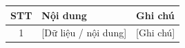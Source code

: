 \begin{tabular}{|c|l|l|}
  \hline
  \textbf{STT} & \textbf{Nội dung} & \textbf{Ghi chú} \\
  \hline
  1 & [Dữ liệu / nội dung] & [Ghi chú] \\
  \hline
\end{tabular}
